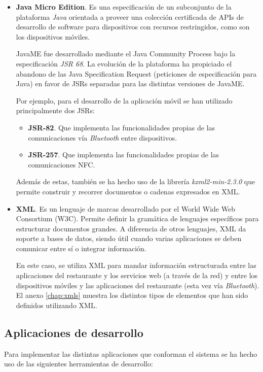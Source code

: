 \begin{itemize}
  \item \textbf{Java Micro Edition}.
  Es una especificación de un subconjunto de la
  plataforma \emph{Java} orientada a proveer una colección certificada de
  \acs{API}s de desarrollo de software para dispositivos con recursos
  restringidos, como son los dispositivos móviles.

  \acs{JavaME} fue desarrollado mediante el Java Community Process bajo la 
  especificación \emph{JSR 68}. La evolución de la plataforma ha propiciado el 
  abandono de las Java Specification Request (peticiones de especificación 
  para Java) en favor de \acs{JSR}s separadas para las distintas versiones de 
  \acs{JavaME}.

  Por ejemplo, para el desarrollo de la aplicación móvil se han utilizado
  principalmente dos \acs{JSR}s:
    \begin{itemize}
    \item \textbf{JSR-82}. Que implementa las funcionalidades
    propias de las comunicaciones vía \emph{Bluetooth} entre dispositivos.
    \item \textbf{JSR-257}. Que implementa las funcionalidades propias
    de las comunicaciones \acs{NFC}.
    \end{itemize}

  Además de estas, también se ha hecho uso de la librería
  \emph{kxml2-min-2.3.0} que permite construir y recorrer documentos o cadenas 
  expresados en \acs{XML}.

  \item \textbf{XML}.
  Es un lenguaje de marcas desarrollado por el
  World Wide Web Consortium (\acs{W3C}). Permite definir la gramática de
  lenguajes específicos para estructurar documentos grandes. A diferencia de
  otros lenguajes, \acs{XML} da soporte a bases de datos, siendo útil cuando
  varias aplicaciones se deben comunicar entre sí o integrar información.

  En este caso, se utiliza \acs{XML} para mandar información estructurada 
  entre las aplicaciones del restaurante y los servicios web (a través de la
  red) y entre los dispositivos móviles y las aplicaciones del restaurante 
  (esta vez vía \emph{Bluetooth}). El anexo \ref{chap:xmls} muestra los 
  distintos tipos de elementos que han sido definidos utilizando \acs{XML}.
  \end{itemize}

  \subsection{Aplicaciones de desarrollo}
  Para implementar las distintas aplicaciones que conforman el sistema se
  ha hecho uso de las siguientes herramientas de desarrollo:
  
